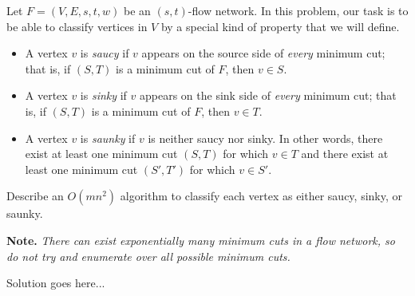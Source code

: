 \documentclass{article}
\begin{document}
\begin{question}
Let $F = (V, E, s, t, w)$ be an $(s, t)$-flow network. In this problem, our task is to be able to classify vertices in $V$ by a special kind of property that we will define.

\begin{itemize}
    \item A vertex $v$ is {\em saucy} if $v$ appears on the source side of {\em every} minimum cut; that is, if $(S, T)$ is a minimum cut of $F$, then $v \in S$.

    \item A vertex $v$ is {\em sinky} if $v$ appears on the sink side of {\em every} minimum cut; that is, if $(S, T)$ is a minimum cut of $F$, then $v \in T$.

    \item A vertex $v$ is {\em saunky} if $v$ is neither saucy nor sinky. In other words, there exist at least one minimum cut $(S, T)$ for which $v \in T$ and there exist at least one minimum cut $(S', T')$ for which $v \in S'$.
\end{itemize}

Describe an $O(mn^2)$ algorithm to classify each vertex as either saucy, sinky, or saunky.

{\bfseries Note.} {\em There can exist exponentially many minimum cuts in a flow network, so do not try and enumerate over all possible minimum cuts.}
\end{question}

\begin{solution}
Solution goes here...
\end{solution}
\end{document}
